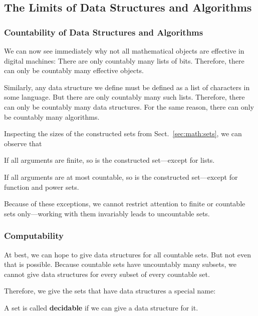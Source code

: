 \subsection{The Limits of Data Structures and Algorithms}\label{sec:ad:computable}

\subsubsection{Countability of Data Structures and Algorithms}

We can now see immediately why not all mathematical objects are effective in digital machines: There are only countably many lists of bits.
Therefore, there can only be countably many effective objects.

Similarly, any data structure we define must be defined as a list of characters in some language.
But there are only countably many such lists.
Therefore, there can only be countably many data structures.
For the same reason, there can only be countably many algorithms.
\medskip

Inspecting the sizes of the constructed sets from Sect.~\ref{sec:math:sets}, we can observe that
\begin{compactitem}
\item If all arguments are finite, so is the constructed set---except for lists.
\item If all arguments are at most countable, so is the constructed set---except for function and power sets.
\end{compactitem}
Because of these exceptions, we cannot restrict attention to finite or countable sets only---working with them invariably leads to uncountable sets.

\subsubsection{Computability}

At best, we can hope to give data structures for all countable sets.
But not even that is possible.
Because countable sets have uncountably many subsets, we cannot give data structures for every subset of every countable set.

Therefore, we give the sets that have data structures a special name:

\begin{definition}[Decidable]
A set is called \textbf{decidable} if we can give a data structure for it.
\end{definition}

